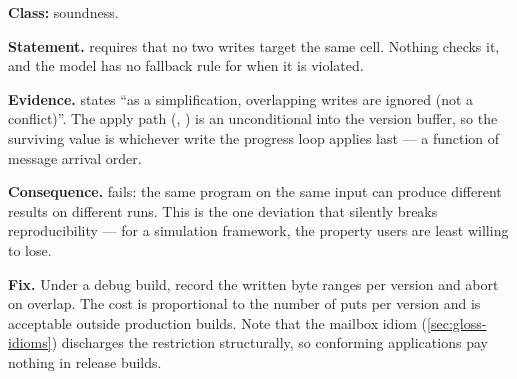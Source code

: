 \begin{deviation}\label{dev:write-disjoint}
\textbf{Class:} soundness.

\textbf{Statement.}  requires that no two writes
target the same \gls{cell}. Nothing checks it, and the model has no fallback rule
for when it is violated.

\textbf{Evidence.} \cite{dstm2026} states ``as a simplification, overlapping
writes are ignored (not a conflict)''. The apply path
(, ) is an unconditional 
into the version buffer, so the surviving value is whichever write the
progress loop applies last --- a function of message arrival order.

\textbf{Consequence.}  fails: the same program on the
same input can produce different results on different runs. This is the one
deviation that silently breaks reproducibility --- for a simulation framework,
the property users are least willing to lose.

\textbf{Fix.} Under a debug build, record the written byte ranges per version
and abort on overlap. The cost is proportional to the number of \glspl{put} per
version and is acceptable outside production builds. Note that the mailbox
idiom (\cref{sec:gloss-idioms}) discharges the restriction structurally, so
conforming applications pay nothing in release builds.
\end{deviation}

